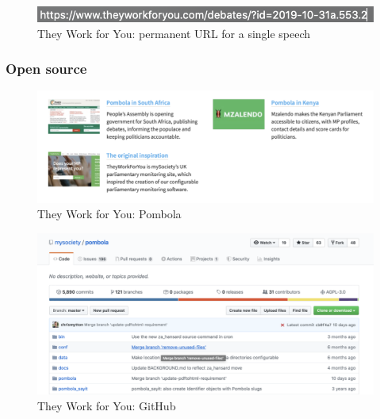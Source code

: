 \documentclass{article}
\begin{document}
			\begin{figure}[h]
				\centering
				\includegraphics[scale=0.5]{images/they-work-for-you-implementation-permanent-urls-3}
				\caption{They Work for You: permanent URL for a single speech}
				\label{fig:they-work-for-you-implementation-permanent-urls-3}
			\end{figure}
					
        	\subsubsection*{Open source}
        	

			\begin{figure}[h]
				\centering
				\includegraphics[scale=0.4]{images/they-work-for-you-implementation-open-source-pombola}
				\caption{They Work for You: Pombola}
				\label{fig:they-work-for-you-implementation-open-source-pombola}
			\end{figure}
			
			\begin{figure}[h]
				\centering
				\includegraphics[scale=0.4]{images/they-work-for-you-implementation-open-source-github}
				\caption{They Work for You: GitHub}
				\label{fig:they-work-for-you-implementation-open-source-github}
			\end{figure}
						
\end{document}
